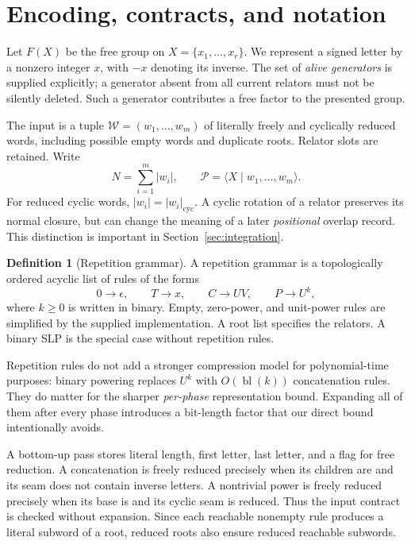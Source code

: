 \documentclass[11pt,letterpaper]{article}
\theoremstyle{definition}
\newtheorem{definition}[theorem]{Definition}
\theoremstyle{remark}\newtheorem{remark}[theorem]{Remark}
\newcommand{\calW}{\mathcal W}
\newcommand{\calP}{\mathcal P}
\newcommand{\bl}{\operatorname{bl}}
\newcommand{\len}[1]{\left|#1\right|_{\mathrm{cyc}}}
\begin{document}
\section{Encoding, contracts, and notation}
\label{sec:encoding}

Let $F(X)$ be the free group on $X=\{x_1,\ldots,x_r\}$. We represent a signed
letter by a nonzero integer $x$, with $-x$ denoting its inverse. The set of
\emph{alive generators} is supplied explicitly; a generator absent from all
current relators must not be silently deleted. Such a generator contributes
a free factor to the presented group.

The input is a tuple $\calW=(w_1,\ldots,w_m)$ of literally freely and cyclically
reduced words, including possible empty words and duplicate roots. Relator
slots are retained. Write
\[
 N=\sum_{i=1}^m |w_i|,\qquad
 \calP=\langle X\mid w_1,\ldots,w_m\rangle.
\]
For reduced cyclic words, $|w_i|=\len{w_i}$. A cyclic rotation of a relator
preserves its normal closure, but can change the meaning of a later
\emph{positional} overlap record. This distinction is important in
Section~\ref{sec:integration}.

\begin{definition}[Repetition grammar]
A repetition grammar is a topologically ordered acyclic list of rules of the
forms
\[
 0\to\epsilon,\qquad T\to x,\qquad C\to UV,
 \qquad P\to U^k,
\]
where $k\geq 0$ is written in binary. Empty, zero-power, and unit-power rules
are simplified by the supplied implementation. A root list specifies the
relators. A binary SLP is the special case without repetition rules.
\end{definition}

Repetition rules do not add a stronger compression model for polynomial-time
purposes: binary powering replaces $U^k$ with $O(\bl(k))$ concatenation rules.
They do matter for the sharper \emph{per-phase} representation bound. Expanding
all of them after every phase introduces a bit-length factor that our direct
bound intentionally avoids.

A bottom-up pass stores literal length, first letter, last letter, and a flag
for free reduction. A concatenation is freely reduced precisely when its
children are and its seam does not contain inverse letters. A nontrivial
power is freely reduced precisely when its base is and its cyclic seam is
reduced. Thus the input contract is checked without expansion. Since each
reachable nonempty rule produces a literal subword of a root, reduced roots
also ensure reduced reachable subwords.
\end{document}
